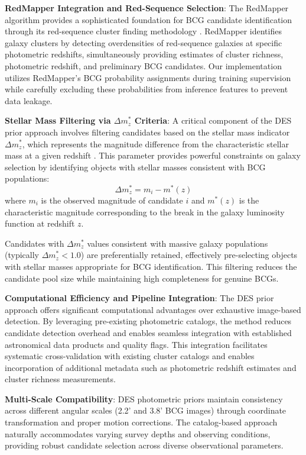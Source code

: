 \documentclass[twocolumn,10pt]{aastex631}
\begin{document}
\textbf{RedMapper Integration and Red-Sequence Selection}: The RedMapper algorithm provides a sophisticated foundation for BCG candidate identification through its red-sequence cluster finding methodology \citep{Rykoff2014redMaPPer}. RedMapper identifies galaxy clusters by detecting overdensities of red-sequence galaxies at specific photometric redshifts, simultaneously providing estimates of cluster richness, photometric redshift, and preliminary BCG candidates. Our implementation utilizes RedMapper's BCG probability assignments during training supervision while carefully excluding these probabilities from inference features to prevent data leakage.

\textbf{Stellar Mass Filtering via $\Delta m^*_z$ Criteria}: A critical component of the DES prior approach involves filtering candidates based on the stellar mass indicator $\Delta m^*_z$, which represents the magnitude difference from the characteristic stellar mass at a given redshift \citep{Rykoff2016}. This parameter provides powerful constraints on galaxy selection by identifying objects with stellar masses consistent with BCG populations:
\begin{equation}
\Delta m^*_z = m_i - m^*(z)
\end{equation}
where $m_i$ is the observed magnitude of candidate $i$ and $m^*(z)$ is the characteristic magnitude corresponding to the break in the galaxy luminosity function at redshift $z$.

Candidates with $\Delta m^*_z$ values consistent with massive galaxy populations (typically $\Delta m^*_z < 1.0$) are preferentially retained, effectively pre-selecting objects with stellar masses appropriate for BCG identification. This filtering reduces the candidate pool size while maintaining high completeness for genuine BCGs.

\textbf{Computational Efficiency and Pipeline Integration}: The DES prior approach offers significant computational advantages over exhaustive image-based detection. By leveraging pre-existing photometric catalogs, the method reduces candidate detection overhead and enables seamless integration with established astronomical data products and quality flags. This integration facilitates systematic cross-validation with existing cluster catalogs and enables incorporation of additional metadata such as photometric redshift estimates and cluster richness measurements.

\textbf{Multi-Scale Compatibility}: DES photometric priors maintain consistency across different angular scales (2.2' and 3.8' BCG images) through coordinate transformation and proper motion corrections. The catalog-based approach naturally accommodates varying survey depths and observing conditions, providing robust candidate selection across diverse observational parameters.
\end{document}
